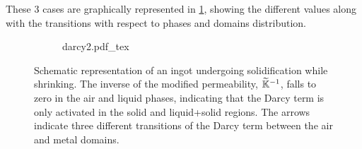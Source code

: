 These 3 cases are graphically represented in \cref{fig:darcy_modif}, showing the different values along with the transitions 
with respect to phases and domains distribution. 
\begin{figure}[htbp]
\centering
  \begin{subfigure}{1.0\textwidth}
    \centering
    \def\svgwidth{250pt}
	{darcy2.pdf_tex}
  \end{subfigure}
\caption{Schematic representation of an ingot undergoing solidification while shrinking. 
The inverse of the modified permeability, $\widetilde{\mathbb{K}}^{-1}$, falls to zero in the air and liquid phases,
indicating that the Darcy term is only activated in the solid and liquid+solid regions.
The arrows indicate three different transitions of the Darcy term between the air and metal domains.}
\label{fig:darcy_modif}
\end{figure}

